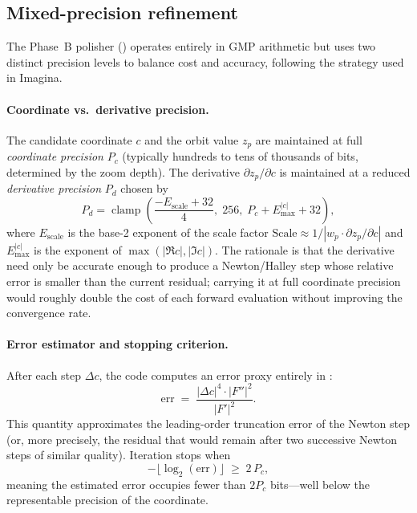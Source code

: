 \subsection{Mixed-precision refinement}
\label{subsec:ff-mixed-prec}

The Phase~B polisher () operates entirely in GMP
 arithmetic but uses two distinct precision levels to balance cost
and accuracy, following the strategy used in Imagina.

\paragraph{Coordinate vs.\ derivative precision.}
The candidate coordinate $c$ and the orbit value $z_p$ are maintained at full
\emph{coordinate precision} $P_c$ (typically hundreds to tens of thousands of
bits, determined by the zoom depth).  The derivative
$\partial z_p/\partial c$ is maintained at a reduced \emph{derivative
precision} $P_d$ chosen by
\begin{equation}\label{eq:ff-deriv-prec}
P_d = \operatorname{clamp}\!\left(
  \frac{-E_{\mathrm{scale}} + 32}{4},\;
  256,\;
  P_c + E_{\max}^{|c|} + 32
\right),
\end{equation}
where $E_{\mathrm{scale}}$ is the base-2 exponent of the scale factor
$\text{Scale} \approx 1/|w_p \cdot \partial z_p/\partial c|$ and
$E_{\max}^{|c|}$ is the exponent of $\max(|\Re c|,|\Im c|)$.
The rationale is that the derivative need only be accurate enough to produce
a Newton/Halley step whose relative error is smaller than the current
residual; carrying it at full coordinate precision would roughly double the
cost of each forward evaluation without improving the convergence rate.

\paragraph{Error estimator and stopping criterion.}
After each step $\Delta c$, the code computes an error proxy entirely in
:
\begin{equation}\label{eq:ff-err}
\mathrm{err} \;=\;
  \frac{|\Delta c|^4 \cdot |F''|^2}{|F'|^2}.
\end{equation}
This quantity approximates the leading-order truncation error of the Newton
step (or, more precisely, the residual that would remain after two successive
Newton steps of similar quality).  Iteration stops when
\begin{equation}\label{eq:ff-stop}
-\lfloor \log_2(\mathrm{err}) \rfloor \;\ge\; 2\,P_c,
\end{equation}
meaning the estimated error occupies fewer than $2P_c$ bits---well below the
representable precision of the coordinate.

